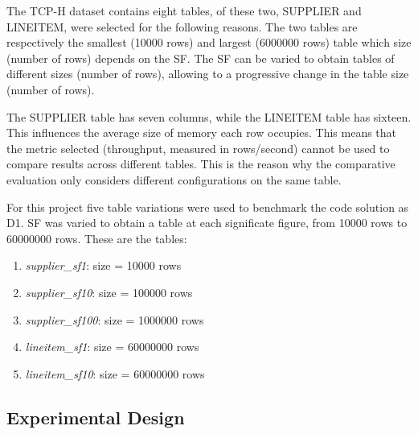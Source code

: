 The TCP-H dataset contains eight tables, of these two, SUPPLIER and LINEITEM, were selected for the following reasons. The two tables are respectively the smallest (10000 rows) and largest (6000000 rows) table which size (number of rows) depends on the \gls{SF}. The \gls{SF} can be varied to obtain tables of different sizes (number of rows), allowing to a progressive change in the table size (number of rows). 

The SUPPLIER table has seven columns, while the LINEITEM table has sixteen. This influences the average size of memory each row occupies. This means that the metric selected (throughput, measured in rows/second) cannot be used to compare results across different tables. This is the reason why the comparative evaluation only considers different configurations on the same table. 

For this project five table variations were used to benchmark the code solution as D1. \gls{SF} was varied to obtain a table at each significate figure, from 10000 rows to 60000000 rows. These are the tables:
\begin{enumerate}
    \item \textit{supplier\_sf1}: size = 10000 rows
    \item \textit{supplier\_sf10}: size = 100000 rows
    \item \textit{supplier\_sf100}: size = 1000000 rows
    \item \textit{lineitem\_sf1}: size = 60000000 rows
    \item \textit{lineitem\_sf10}: size = 60000000 rows
\end{enumerate}

\subsection{Experimental Design}
%

